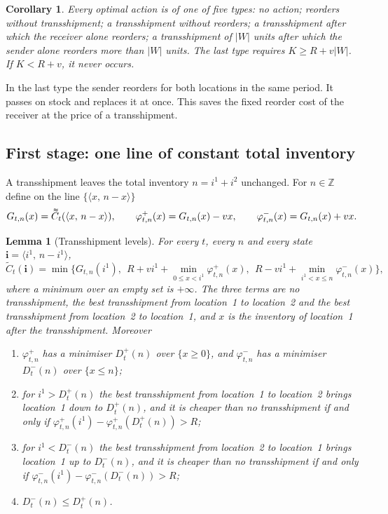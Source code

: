 \documentclass[11pt]{article}
\DeclareRobustCommand{\dbtilde}[1]{\accentset{\approx}{#1}}
\renewcommand{\vec}[1]{\boldsymbol{#1}}
\newcommand{\Z}{\mathbb{Z}}
\newcommand{\Ct}{\widetilde{C}}
\newcommand{\Cq}{\dbtilde{C}}
\newtheorem{lemma}{Lemma}
\newtheorem{corollary}{Corollary}
\theoremstyle{definition}
\begin{document}
\begin{corollary}\label{cor:types}
Every optimal action is of one of five types: no action; reorders without transshipment; a transshipment without reorders; a transshipment after which the receiver alone reorders; a transshipment of $|W|$ units after which the sender alone reorders more than $|W|$ units. The last type requires $K\ge R+v|W|$. If $K<R+v$, it never occurs.
\end{corollary}

In the last type the sender reorders for both locations in the same period. It passes on stock and replaces it at once. This saves the fixed reorder cost of the receiver at the price of a transshipment.

\subsection{First stage: one line of constant total inventory}

A transshipment leaves the total inventory $n=i^1+i^2$ unchanged. For $n\in\Z$ define on the line $\{\langle x,\,n-x\rangle\}$
\[
G_{t,n}(x)=\Cq_t(\langle x,\,n-x\rangle),\qquad \varphi^+_{t,n}(x)=G_{t,n}(x)-vx,\qquad \varphi^-_{t,n}(x)=G_{t,n}(x)+vx .
\]

\begin{lemma}[Transshipment levels]\label{lem:line}
For every $t$, every $n$ and every state $\vec{i}=\langle i^1,\,n-i^1\rangle$,
\begin{equation}\label{eq:line}
\Ct_t(\vec{i})=\min\Big\{G_{t,n}(i^1),\ \ R+vi^1+\min_{0\le x<i^1}\varphi^+_{t,n}(x),\ \ R-vi^1+\min_{i^1<x\le n}\varphi^-_{t,n}(x)\Big\},
\end{equation}
where a minimum over an empty set is $+\infty$. The three terms are no transshipment, the best transshipment from location~1 to location~2 and the best transshipment from location~2 to location~1, and $x$ is the inventory of location~1 after the transshipment. Moreover
\begin{enumerate}[label=(\roman*)]
\item $\varphi^+_{t,n}$ has a minimiser $D^+_t(n)$ over $\{x\ge0\}$, and $\varphi^-_{t,n}$ has a minimiser $D^-_t(n)$ over $\{x\le n\}$;
\item for $i^1>D^+_t(n)$ the best transshipment from location~1 to location~2 brings location~1 down to $D^+_t(n)$, and it is cheaper than no transshipment if and only if $\varphi^+_{t,n}(i^1)-\varphi^+_{t,n}(D^+_t(n))>R$;
\item for $i^1<D^-_t(n)$ the best transshipment from location~2 to location~1 brings location~1 up to $D^-_t(n)$, and it is cheaper than no transshipment if and only if $\varphi^-_{t,n}(i^1)-\varphi^-_{t,n}(D^-_t(n))>R$;
\item $D^-_t(n)\le D^+_t(n)$.
\end{enumerate}
\end{lemma}
\end{document}
